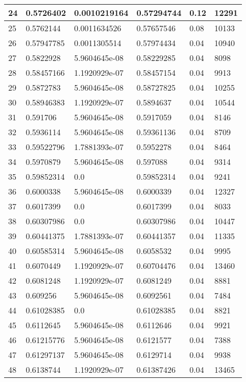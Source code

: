 \begin{longtable}{|l|l|l|l|l|l|}
24 & 0.5726402 & 0.0010219164 & 0.57294744 & 0.12 & 12291 \\ \hline 
25 & 0.5762144 & 0.0011634526 & 0.57657546 & 0.08 & 10133 \\ \hline 
26 & 0.57947785 & 0.0011305514 & 0.57974434 & 0.04 & 10940 \\ \hline 
27 & 0.5822928 & 5.9604645e-08 & 0.58229285 & 0.04 & 8098 \\ \hline 
28 & 0.58457166 & 1.1920929e-07 & 0.58457154 & 0.04 & 9913 \\ \hline 
29 & 0.5872783 & 5.9604645e-08 & 0.58727825 & 0.04 & 10255 \\ \hline 
30 & 0.58946383 & 1.1920929e-07 & 0.5894637 & 0.04 & 10544 \\ \hline 
31 & 0.591706 & 5.9604645e-08 & 0.5917059 & 0.04 & 8146 \\ \hline 
32 & 0.5936114 & 5.9604645e-08 & 0.59361136 & 0.04 & 8709 \\ \hline 
33 & 0.59522796 & 1.7881393e-07 & 0.5952278 & 0.04 & 8464 \\ \hline 
34 & 0.5970879 & 5.9604645e-08 & 0.597088 & 0.04 & 9314 \\ \hline 
35 & 0.59852314 & 0.0 & 0.59852314 & 0.04 & 9241 \\ \hline 
36 & 0.6000338 & 5.9604645e-08 & 0.6000339 & 0.04 & 12327 \\ \hline 
37 & 0.6017399 & 0.0 & 0.6017399 & 0.04 & 8033 \\ \hline 
38 & 0.60307986 & 0.0 & 0.60307986 & 0.04 & 10447 \\ \hline 
39 & 0.60441375 & 1.7881393e-07 & 0.60441357 & 0.04 & 11335 \\ \hline 
40 & 0.60585314 & 5.9604645e-08 & 0.6058532 & 0.04 & 9995 \\ \hline 
41 & 0.6070449 & 1.1920929e-07 & 0.60704476 & 0.04 & 13460 \\ \hline 
42 & 0.6081248 & 1.1920929e-07 & 0.6081249 & 0.04 & 8881 \\ \hline 
43 & 0.609256 & 5.9604645e-08 & 0.6092561 & 0.04 & 7484 \\ \hline 
44 & 0.61028385 & 0.0 & 0.61028385 & 0.04 & 8821 \\ \hline 
45 & 0.6112645 & 5.9604645e-08 & 0.6112646 & 0.04 & 9921 \\ \hline 
46 & 0.61215776 & 5.9604645e-08 & 0.6121577 & 0.04 & 7388 \\ \hline 
47 & 0.61297137 & 5.9604645e-08 & 0.6129714 & 0.04 & 9938 \\ \hline 
48 & 0.6138744 & 1.1920929e-07 & 0.61387426 & 0.04 & 13465 \\ \hline 

\end{longtable}
